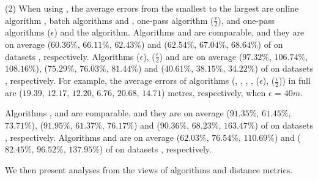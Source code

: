 \sstab (2) When using \sed, the average errors from the smallest
to the largest are online algorithm \squishe, batch algorithms \tpa and \dpa,
one-pass algorithm \cised($\frac{\epsilon}{2}$), and one-pass algorithms \cised(${\epsilon}$) and the \opt algorithm.
%
Algorithms \tpa and \dpa are comparable, and they are on average
{($60.36\%$, $66.11\%$, $62.43\%$) and ($62.54\%$, $67.04\%$, $68.64\%$)} of \opt on datasets \dSets, respectively.
Algorithms \cised(${\epsilon}$), \cised($\frac{\epsilon}{2}$) and \squishe are on average {($97.32\%$, $106.74\%$, $108.16\%$), ($75.29\%$, $76.03\%$, $81.44\%$) and ($40.61\%$, $38.15\%$, $34.22\%$)} of \opt on datasets \dSets, respectively.
%
For example, the average errors of algorithms
(\opt, \tpa, \dpa, \squishe, \cised(${\epsilon}$), \cised($\frac{\epsilon}{2}$)) in full \mopsi are ($19.39$, $12.17$, $12.20$, $6.76$, $20.68$, $14.71$) metres, respectively, when $\epsilon$ = $40m$.
%


Algorithms \tpa, \opwa and \interval are comparable, and they are on average
{($91.35\%$, $61.45\%$, $73.71\%$), ($91.95\%$, $61.37\%$, $76.17\%$) and ($90.36\%$, $68.23\%$, $163.47\%$)} of \opt on datasets \dSets, respectively.
Algorithms \intersec and \dpa are on average ($62.03\%$, $76.54\%$, $110.69\%$) and ($82.45\%$, $96.52\%$, $137.95\%$) of \opt on datasets \dSets, respectively.




We then present analyses from the views of \lsa algorithms and distance metrics.



